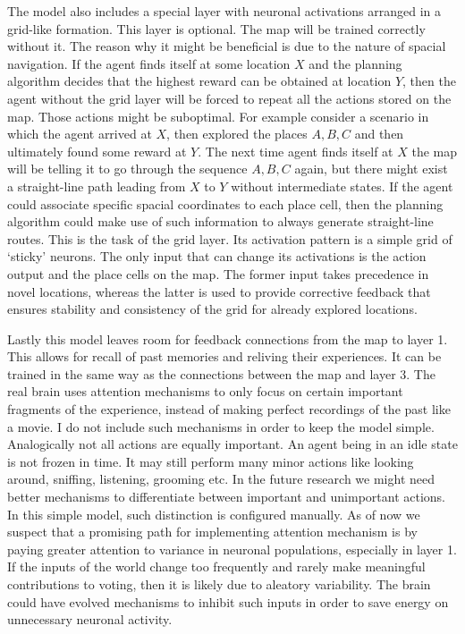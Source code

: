 \documentclass[12pt]{article}
\begin{document}
The model also includes a special layer with neuronal activations arranged in a grid-like formation. This layer is optional. The map will be trained correctly without it. The reason why it might be beneficial is due to the nature of spacial navigation. If the agent finds itself at some location $X$ and the planning algorithm decides that the highest reward can be obtained at location $Y$, then the agent without the grid layer will be forced to repeat all the actions stored on the map. Those actions might be suboptimal. For example consider a scenario in which the agent arrived at $X$, then explored the places $A,B,C$ and then ultimately found some reward at $Y$. The next time agent finds itself at $X$ the map will be telling it to go through the sequence $A,B,C$ again, but there might exist a straight-line path leading from $X$ to $Y$ without intermediate states. If the agent could associate specific spacial coordinates to each place cell, then the planning algorithm could make use of such information to always generate straight-line routes. This is the task of the grid layer. Its activation pattern is a simple grid of `sticky' neurons. The only input that can change its activations is the action output and the place cells on the map. The former input takes precedence in novel locations, whereas the latter is used to provide corrective feedback that ensures stability and consistency of the grid for already explored locations.

Lastly this model leaves room for feedback connections from the map to layer 1. This allows for recall of past memories and reliving their experiences. It can be trained in the same way as the connections between the map and layer 3. The real brain uses attention mechanisms to only focus on certain important fragments of the experience, instead of making perfect recordings of the past like a movie. I do not include such mechanisms in order to keep the model simple. Analogically not all actions are equally important. An agent being in an idle state is not frozen in time. It may still perform many minor actions like looking around, sniffing, listening, grooming etc. In the future research we might need better mechanisms to differentiate between important and unimportant actions. In this simple model, such distinction is configured manually.  As of now we suspect that a promising path for implementing attention mechanism is by paying greater attention to variance in neuronal populations, especially in layer 1. If the inputs of the world change too frequently and rarely make meaningful contributions to voting, then it is likely due to aleatory variability. The brain could have evolved mechanisms to inhibit such inputs in order to save energy on unnecessary neuronal activity.
\end{document}
